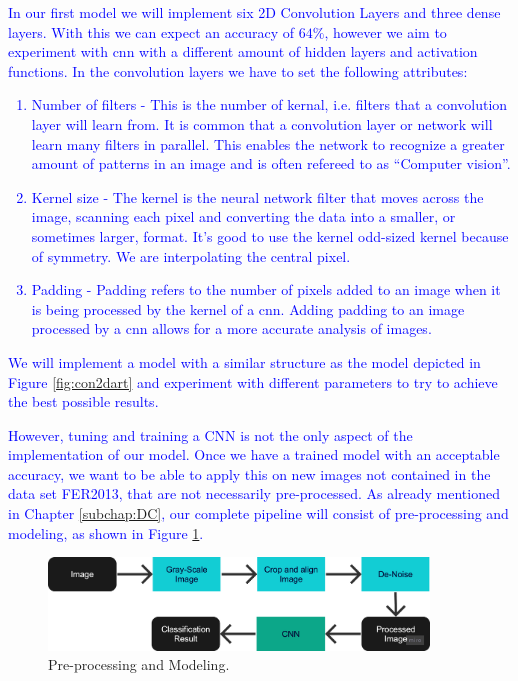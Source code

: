\textcolor{blue}{
In our first model we will implement six 2D Convolution Layers and three dense layers. With this we can expect an accuracy of $64\%$, however we aim to experiment with \acrshort{cnn} with a different amount of hidden layers and activation functions. In the convolution layers we have to set the following attributes: 
\begin{enumerate}
    \item Number of filters - This is the number of kernal, i.e. filters that a convolution layer will learn from. It is common that a convolution layer or network will learn many filters in parallel. This enables the network to recognize a greater amount of patterns in an image and is often refereed to as ``Computer vision''.
    \item Kernel size - The kernel is the neural network filter that moves across the image, scanning each pixel and converting the data into a smaller, or sometimes larger, format. It's good to use the kernel odd-sized kernel because of symmetry. We are interpolating the central pixel.
    \item Padding - Padding refers to the number of pixels added to an image when it is being processed by the kernel of a \acrshort{cnn}. Adding padding to an image processed by a \acrshort{cnn} allows for a more accurate analysis of images.
\end{enumerate}
We will implement a model with a similar structure as the model depicted in Figure \ref{fig:con2dart} and experiment with different parameters to try to achieve the best possible results. }

\textcolor{blue}{
However, tuning and training a CNN is not the only aspect of the implementation of our model. Once we have a trained model with an acceptable accuracy, we want to be able to apply this on new images not contained in the data set FER2013, that are not necessarily pre-processed. As already mentioned in Chapter \ref{subchap:DC}, our complete pipeline will consist of pre-processing and modeling, as shown in Figure \ref{fig:prep-mod}.}


\begin{figure}[h]
\centering
\includegraphics[width=0.9\textwidth]{images/fer-preprocessing-modelling.png}
\caption{Pre-processing and Modeling.}\label{fig:prep-mod}
\end{figure}
